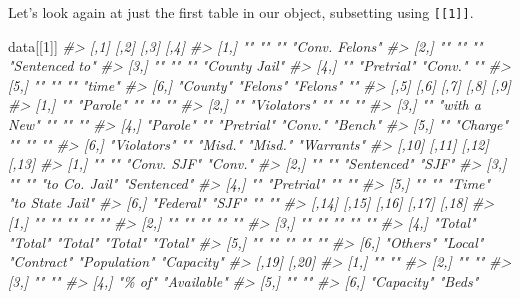 \documentclass[
]{krantz}
\makeatletter
\newenvironment{Shaded}{\begin{snugshade}}{\end{snugshade}}
\newcommand{\CommentTok}[1]{\textcolor[rgb]{0.37,0.37,0.37}{\textit{#1}}}
\newcommand{\DecValTok}[1]{\textcolor[rgb]{0.06,0.06,0.06}{#1}}
\newcommand{\NormalTok}[1]{#1}
\newenvironment{kframe}{%
\medskip{}
\setlength{\fboxsep}{.8em}
 \def\at@end@of@kframe{}%
 \ifinner\ifhmode%
  \def\at@end@of@kframe{\end{minipage}}%
  \begin{minipage}{\columnwidth}%
 \fi\fi%
 \def\FrameCommand##1{\hskip\@totalleftmargin \hskip-\fboxsep
 \colorbox{shadecolor}{##1}\hskip-\fboxsep
     \hskip-\linewidth \hskip-\@totalleftmargin \hskip\columnwidth}%
 \MakeFramed {\advance\hsize-\width
   \@totalleftmargin\z@ \linewidth\hsize
   \@setminipage}}%
 {\par\unskip\endMakeFramed%
 \at@end@of@kframe}
\renewenvironment{Shaded}{\begin{kframe}}{\end{kframe}}
\makeatother
\begin{document}
Let's look again at just the first table in our object,
subsetting using \texttt{{[}{[}1{]}{]}}.

\begin{Shaded}
\begin{Highlighting}[]
\NormalTok{data[[}\DecValTok{1}\NormalTok{]]}
\CommentTok{\#\textgreater{}      [,1]     [,2]       [,3]     [,4]          }
\CommentTok{\#\textgreater{} [1,] ""       ""         ""       "Conv. Felons"}
\CommentTok{\#\textgreater{} [2,] ""       ""         ""       "Sentenced to"}
\CommentTok{\#\textgreater{} [3,] ""       ""         ""       "County Jail" }
\CommentTok{\#\textgreater{} [4,] ""       "Pretrial" "Conv."  ""            }
\CommentTok{\#\textgreater{} [5,] ""       ""         ""       "time"        }
\CommentTok{\#\textgreater{} [6,] "County" "Felons"   "Felons" ""            }
\CommentTok{\#\textgreater{}      [,5]        [,6]         [,7]       [,8]    [,9]      }
\CommentTok{\#\textgreater{} [1,] ""          "Parole"     ""         ""      ""        }
\CommentTok{\#\textgreater{} [2,] ""          "Violators"  ""         ""      ""        }
\CommentTok{\#\textgreater{} [3,] ""          "with a New" ""         ""      ""        }
\CommentTok{\#\textgreater{} [4,] "Parole"    ""           "Pretrial" "Conv." "Bench"   }
\CommentTok{\#\textgreater{} [5,] ""          "Charge"     ""         ""      ""        }
\CommentTok{\#\textgreater{} [6,] "Violators" ""           "Misd."    "Misd." "Warrants"}
\CommentTok{\#\textgreater{}      [,10]     [,11]      [,12]         [,13]          }
\CommentTok{\#\textgreater{} [1,] ""        ""         "Conv. SJF"   "Conv."        }
\CommentTok{\#\textgreater{} [2,] ""        ""         "Sentenced"   "SJF"          }
\CommentTok{\#\textgreater{} [3,] ""        ""         "to Co. Jail" "Sentenced"    }
\CommentTok{\#\textgreater{} [4,] ""        "Pretrial" ""            ""             }
\CommentTok{\#\textgreater{} [5,] ""        ""         "Time"        "to State Jail"}
\CommentTok{\#\textgreater{} [6,] "Federal" "SJF"      ""            ""             }
\CommentTok{\#\textgreater{}      [,14]    [,15]   [,16]      [,17]        [,18]     }
\CommentTok{\#\textgreater{} [1,] ""       ""      ""         ""           ""        }
\CommentTok{\#\textgreater{} [2,] ""       ""      ""         ""           ""        }
\CommentTok{\#\textgreater{} [3,] ""       ""      ""         ""           ""        }
\CommentTok{\#\textgreater{} [4,] "Total"  "Total" "Total"    "Total"      "Total"   }
\CommentTok{\#\textgreater{} [5,] ""       ""      ""         ""           ""        }
\CommentTok{\#\textgreater{} [6,] "Others" "Local" "Contract" "Population" "Capacity"}
\CommentTok{\#\textgreater{}      [,19]      [,20]      }
\CommentTok{\#\textgreater{} [1,] ""         ""         }
\CommentTok{\#\textgreater{} [2,] ""         ""         }
\CommentTok{\#\textgreater{} [3,] ""         ""         }
\CommentTok{\#\textgreater{} [4,] "\% of"     "Available"}
\CommentTok{\#\textgreater{} [5,] ""         ""         }
\CommentTok{\#\textgreater{} [6,] "Capacity" "Beds"}
\end{Highlighting}
\end{Shaded}
\end{document}
